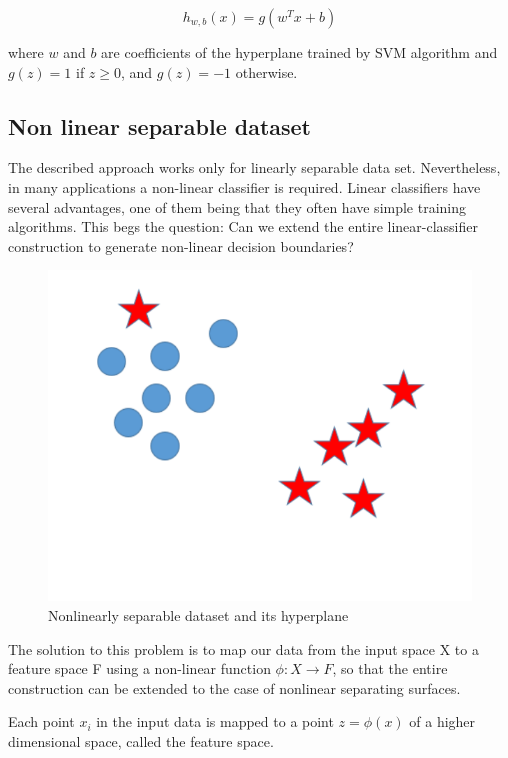 \begin{equation}
h_{w,b}(x) = g(w^T x + b)
\end{equation}

where $w$ and $b$ are coefficients of the hyperplane trained by SVM algorithm and $g(z)=1$ if $z\geq0$, and $g(z)=-1$ otherwise.


\subsection{Non linear separable dataset}

The described approach works only for linearly separable data set. Nevertheless, in many applications a non-linear classifier is required. Linear classifiers have several advantages, one of them being that they often have simple training algorithms. 
This begs the question: Can we extend the entire linear-classifier construction to generate non-linear decision boundaries? 

\begin{figure}[H]
\centering
\includegraphics[scale=0.5]{img/svm/nonlinear.png}
\caption{Nonlinearly separable dataset and its hyperplane}
\end{figure} 

The solution to this problem is to map our data from
the input space X to a feature space F using a non-linear function $\phi : X \rightarrow F$, so that the entire construction can be extended to the case of nonlinear separating surfaces. 

Each point $x_{i}$ in the input data is mapped to a point $z = \phi(x)$ of a higher dimensional space, called the feature space.


